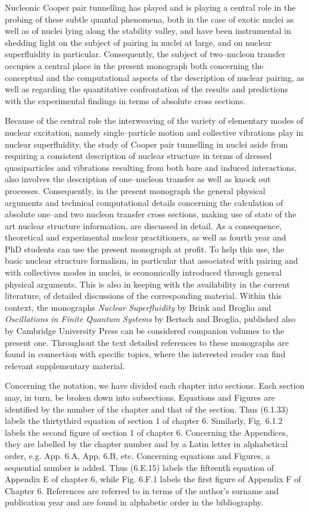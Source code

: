  Nucleonic Cooper pair tunnelling has played and is playing a central role in the probing of these subtle quantal phenomena, both in the case of  exotic nuclei as well as of nuclei lying along the stability valley, and have been instrumental in shedding light on the subject of pairing in nuclei at large, and on nuclear superfluidity in particular. Consequently, the subject of two--nucleon transfer occupies  a central place in the present monograph both concerning the conceptual and the computational aspects of the description of nuclear pairing, as well as regarding the quantitative confrontation of the results and predictions with the experimental findings in terms of absolute cross sections.

Because of the central role the interweaving of the variety of elementary modes of nuclear excitation, namely single--particle motion and collective vibrations play in nuclear superfluidity, the study of Cooper pair tunnelling in nuclei aside from requiring a consistent description of nuclear structure in terms of dressed quasiparticles and vibrations resulting from both bare and induced interactions, also involves  the description of one--nucleon transfer as well as knock out processes. Consequently, in the present monograph the general physical arguments and technical computational details concerning the   calculation of  absolute one--and two nucleon  transfer cross sections, making use of state of the art nuclear structure information, are discussed in detail. As a consequence, theoretical and experimental nuclear practitioners, as well as fourth year and PhD students can use the present monograph at profit. To help this use, the basic nuclear structure formalism, in particular that associated with pairing and with collectives modes in nuclei, is economically introduced through general physical arguments. This is also in keeping with the availability in the current literature, of detailed discussions of the corresponding material. Within this context, the monographs \emph{Nuclear Superfluidity} by Brink and Broglia and \emph{Oscillations in Finite Quantum Systems}  by Bertsch and Broglia, published also by Cambridge University Press can be considered companion volumes to the present one. Throughout the text detailed references to these monographs are found in connection with specific topics, where the interested reader can find relevant supplementary material.


Concerning the notation, we have divided each chapter into sections. Each section may, in turn, be broken down into subsections. Equations and Figures are identified by the number of the chapter and that of the section. Thus (6.1.33) labels the thirtythird equation of section 1 of chapter 6. Similarly, Fig. 6.1.2 labels the second figure of section 1 of chapter 6. Concerning the Appendices, they are labelled by the chapter number and by a Latin letter in alphabetical order, e.g. App. 6.A, App. 6.B, etc. Concerning equations and Figures, a sequential number is added. Thus (6.E.15) labels the fifteenth equation of Appendix E of chapter 6, while Fig. 6.F.1 labels the first figure of Appendix F of Chapter 6. References are referred to in terms of the author's surname and publication year and are found in alphabetic order in the bibliography.

